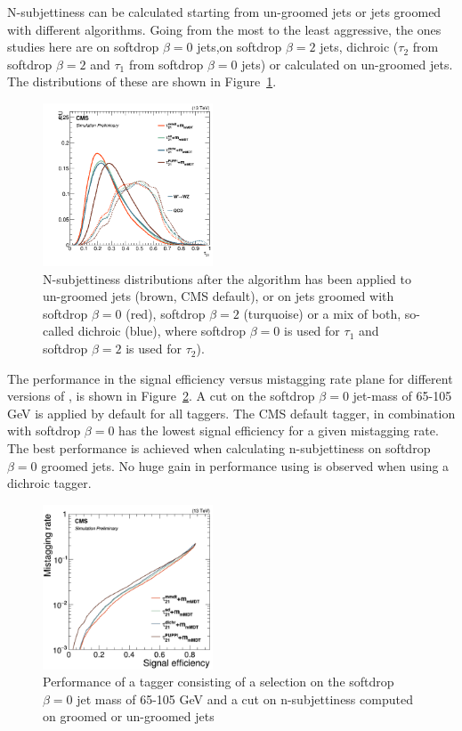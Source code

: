 N-subjettiness can be calculated starting from un-groomed jets or jets groomed with different algorithms. Going from the most to the least aggressive, the ones studies here are \nsubj on softdrop $\beta=0$ jets,\nsubj on softdrop $\beta=2$ jets, dichroic \nsubj ($\tau_2$ from softdrop $\beta=2$ and $\tau_1$ from softdrop $\beta=0$ jets) or \nsubj calculated on un-groomed jets. The distributions of these are shown in Figure~\ref{fig:app:tau21plots}.
\begin{figure}[h!]
\centering
\includegraphics[width=0.45\textwidth]{figures/vtagging/dichroic/tau21plots.png}
\caption{N-subjettiness distributions after the algorithm has been applied to un-groomed jets (brown, CMS default), or on jets groomed with softdrop $\beta=0$ (red), softdrop $\beta=2$ (turquoise) or a mix of both, so-called dichroic (blue), where softdrop $\beta=0$ is used for $\tau_1$ and softdrop $\beta=2$ is used for $\tau_2$).}
\label{fig:app:tau21plots}
\end{figure}
The performance in the signal efficiency versus mistagging rate plane for different versions of \nsubj, is shown in Figure~\ref{fig:app:dichroic}. A cut on the softdrop $\beta=0$ jet-mass of 65-105 GeV is applied by default for all taggers. The CMS default tagger, \nsubj in combination with softdrop $\beta=0$ has the lowest signal efficiency for a given mistagging rate. The best performance is achieved when calculating n-subjettiness on softdrop $\beta=0$ groomed jets. No huge gain in performance using is observed when using a dichroic tagger.
\begin{figure}[h!]
\centering
\includegraphics[width=0.45\textwidth]{figures/vtagging/dichroic/dichroic.png}
\caption{Performance of a tagger consisting of a selection on the softdrop $\beta=0$ jet mass of 65-105 GeV and a cut on n-subjettiness computed on groomed or un-groomed jets}
\label{fig:app:dichroic}
\end{figure}

